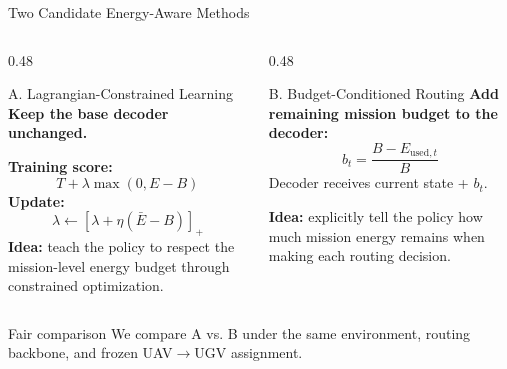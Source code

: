 \documentclass[aspectratio=169,10pt]{beamer}
\begin{document}
\begin{frame}{Two Candidate Energy-Aware Methods}
\footnotesize
\begin{columns}[T]
\begin{column}{0.48\textwidth}
\begin{block}{A. Lagrangian-Constrained Learning}
\scriptsize
\textbf{Keep the base decoder unchanged.}

\medskip
\textbf{Training score:}
\[
T+\lambda\max(0,E-B)
\]
\textbf{Update:}
\[
\lambda\leftarrow[\lambda+\eta(\bar E-B)]_+
\]
\textbf{Idea:} teach the policy to respect the mission-level energy budget through constrained optimization.
\end{block}
\end{column}
\begin{column}{0.48\textwidth}
\begin{block}{B. Budget-Conditioned Routing}
\scriptsize
\textbf{Add remaining mission budget to the decoder:}
\[
b_t=\frac{B-E_{\mathrm{used},t}}{B}
\]
Decoder receives current state + $b_t$.

\medskip
\textbf{Idea:} explicitly tell the policy how much mission energy remains when making each routing decision.
\end{block}
\end{column}
\end{columns}
\vspace{3mm}
\begin{block}{Fair comparison}
\centering
We compare A vs. B under the same environment, routing backbone, and frozen UAV$\to$UGV assignment.
\end{block}
\end{frame}
\end{document}
